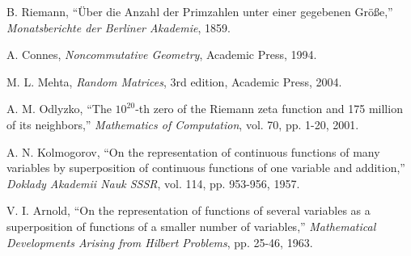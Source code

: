\documentclass[11pt]{article}
\begin{document}
\begin{thebibliography}{99}

B. Riemann, ``Über die Anzahl der Primzahlen unter einer gegebenen Größe,'' 
\textit{Monatsberichte der Berliner Akademie}, 1859.

A. Connes, \textit{Noncommutative Geometry}, Academic Press, 1994.

M. L. Mehta, \textit{Random Matrices}, 3rd edition, Academic Press, 2004.

A. M. Odlyzko, ``The $10^{20}$-th zero of the Riemann zeta function and 175 million of its neighbors,'' 
\textit{Mathematics of Computation}, vol. 70, pp. 1-20, 2001.

A. N. Kolmogorov, ``On the representation of continuous functions of many variables by superposition of continuous functions of one variable and addition,'' 
\textit{Doklady Akademii Nauk SSSR}, vol. 114, pp. 953-956, 1957.

V. I. Arnold, ``On the representation of functions of several variables as a superposition of functions of a smaller number of variables,'' 
\textit{Mathematical Developments Arising from Hilbert Problems}, pp. 25-46, 1963.

\end{thebibliography}
\end{document}
